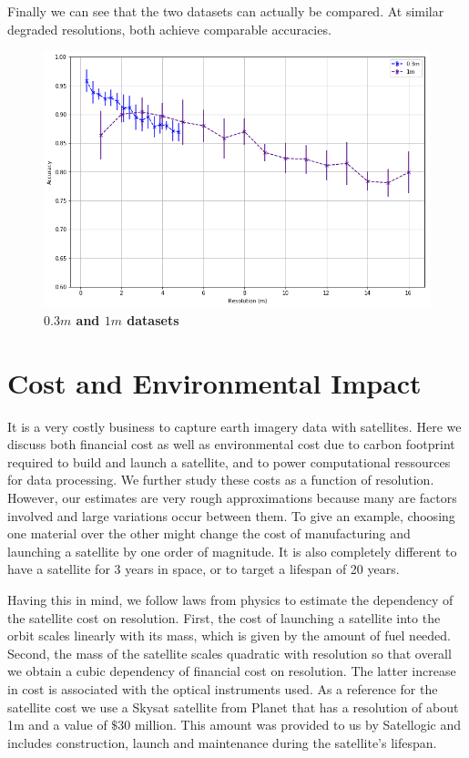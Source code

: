 Finally we can see that the two datasets can actually be compared. At similar degraded resolutions, both achieve comparable accuracies.

\begin{figure}[h!]
	\centering
	\includegraphics[width=\textwidth]{Figures/results/acc_res_03m_1m.png}
	\captionsetup{width=1\linewidth}
	\caption{\textbf{$0.3m$ and $1m$ datasets}}
	\label{fig:acc_res_03m_1m}
\end{figure}


\section{Cost and Environmental Impact}
It is a very costly business to capture earth imagery data with satellites. Here we discuss both financial cost as well as environmental cost due to carbon footprint required to build and launch a satellite, and to power computational ressources for data processing.
We further study these costs as a function of resolution. However, our estimates are very rough approximations because many are factors involved and large variations occur between them. To give an example, choosing one material over the other might change the cost of manufacturing and launching a satellite by one order of magnitude. It is also completely different to have a satellite for 3 years in space, or to target a lifespan of 20 years. 

Having this in mind, we follow laws from physics to estimate the dependency of the satellite cost on resolution. First, the cost of launching a satellite into the orbit scales linearly with its mass, which is given by the amount of fuel needed. Second, the mass of the satellite scales quadratic with resolution so that overall we obtain a cubic dependency of financial cost on resolution. The latter increase in cost is associated with the optical instruments used. As a reference for the satellite cost we use a Skysat satellite from Planet \parencite{skysat_planet} that has a resolution of about 1m and a value of $\$30$ million. This amount was provided to us by Satellogic and includes construction, launch and maintenance during the satellite's lifespan.

